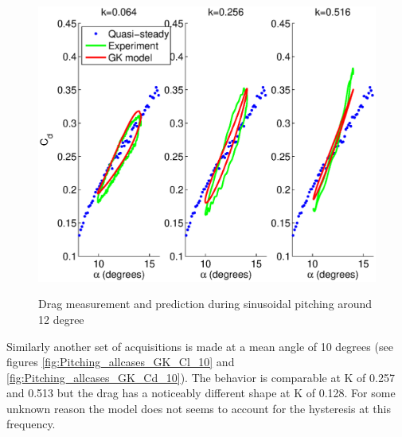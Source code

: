 \begin{figure}[h]
  \begin{center}
    \scalebox{0.8}  
    {\includegraphics{./Figures/Pitching_allcases_GK_CD_12_amp_2.eps}}
  \end{center}
  \caption{Drag measurement and prediction during sinusoidal pitching around 12 degree} 
  \label{fig:Pitching_allcases_GK_Cd_12}
\end{figure}

\par Similarly another set of acquisitions is made at a mean angle of 10 degrees (see figures \ref{fig:Pitching_allcases_GK_Cl_10} and \ref{fig:Pitching_allcases_GK_Cd_10}).
The behavior is comparable at K of 0.257 and 0.513 but the drag has a noticeably different shape at K of 0.128.
For some unknown reason the model does not seems to account for the hysteresis at this frequency.


